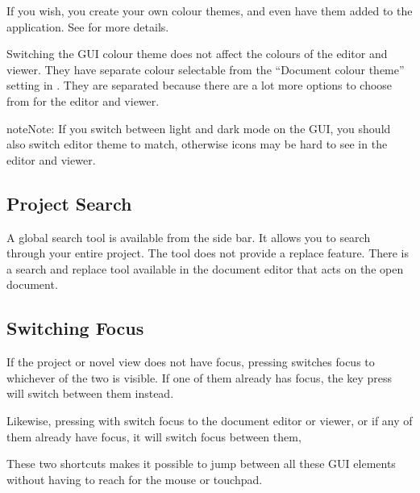 \documentclass[a4paper,11pt,english]{sphinxmanual}
\begin{document}
\sphinxAtStartPar
If you wish, you  create your own colour themes, and even have them added to the application.
See {\hyperref[\detokenize{more_customise:a-custom-theme}]{}} for more details.

\sphinxAtStartPar
Switching the GUI colour theme does not affect the colours of the editor and viewer. They have
separate colour selectable from the “Document colour theme” setting in . They are
separated because there are a lot more options to choose from for the editor and viewer.

\begin{sphinxadmonition}{note}{Note:}
\sphinxAtStartPar
If you switch between light and dark mode on the GUI, you should also switch editor theme to
match, otherwise icons may be hard to see in the editor and viewer.
\end{sphinxadmonition}


\subsection{Project Search}
\label{\detokenize{usage_breakdown:project-search}}
\sphinxAtStartPar
A global search tool is available from the side bar. It allows you to search through your entire
project. The tool does not provide a replace feature. There is a search and replace tool available
in the document editor that acts on the open document.

\sphinxAtStartPar
{}


\subsection{Switching Focus}
\label{\detokenize{usage_breakdown:switching-focus}}
\sphinxAtStartPar
If the project or novel view does not have focus, pressing  switches focus to
whichever of the two is visible. If one of them already has focus, the key press will switch
between them instead.

\sphinxAtStartPar
Likewise, pressing  with switch focus to the document editor or viewer, or if any of
them already have focus, it will switch focus between them,

\sphinxAtStartPar
These two shortcuts makes it possible to jump between all these GUI elements without having to
reach for the mouse or touchpad.
\end{document}
